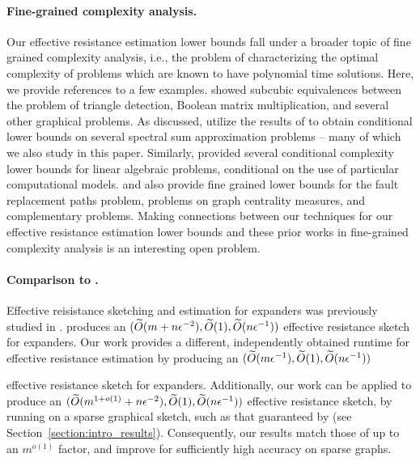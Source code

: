 \paragraph{Fine-grained complexity analysis.}{Our effective resistance estimation lower bounds fall under a broader topic of fine grained complexity analysis, i.e., the problem of characterizing the optimal complexity of problems which are known to have polynomial time solutions. Here, we provide references to a few examples. \cite{william_williams2018} showed subcubic equivalences between the problem of triangle detection, Boolean matrix multiplication, and several other graphical problems. As discussed, \cite{musco2017spectrum} utilize the results of \cite{william_williams2018} to obtain conditional lower bounds on several spectral sum approximation problems -- many of which we also study in this paper. Similarly, \cite{garciamarco2017complexity, Mor73, shpilka2002lower} provided several conditional complexity lower bounds for linear algebraic problems, conditional on the use of particular computational models. \cite{williams2022algorithms} and \cite{boroujeni2019subcubic} also provide fine grained lower bounds for the fault replacement paths problem, problems on graph centrality measures, and complementary problems. Making connections between our techniques for our effective resistance estimation lower bounds and these prior works in fine-grained complexity analysis is an interesting open problem. 

\paragraph{Comparison to \cite{li2022new}.}{ Effective reisistance sketching and estimation for expanders was previously studied in \cite{li2022new}. \cite{li2022new} produces an $(\widetilde{O}( {m + n\epsilon^{-2}} ), \widetilde{O}( {1} ), \widetilde{O}( {n\epsilon^{-1}} ))$} effective resistance sketch for expanders. Our work provides a different, independently obtained runtime for effective resistance estimation by producing an $(\widetilde{O}( {m\epsilon^{-1}} ), \widetilde{O}( {1} ), \widetilde{O}( {n\epsilon^{-1}} ))$} effective resistance sketch for expanders. Additionally, our work can be applied to produce an $(\widetilde{O}( {m^{1+o(1)} + n\epsilon^{-2}} ), \widetilde{O}( {1} ), \widetilde{O}( {n\epsilon^{-1}} ))$ effective resistance sketch, by running on a sparse graphical sketch, such as that guaranteed by \cite{chu2018graph} (see Section~\ref{section:intro_results}). Consequently, our results match those of \cite{li2022new} up to an $m^{o(1)}$ factor, and improve for sufficiently high accuracy on sparse graphs.  

